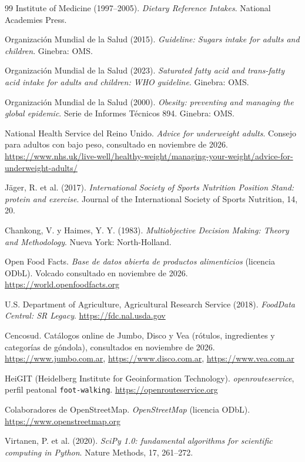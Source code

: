 \documentclass[10pt,a4paper]{article}
\begin{document}
\begin{thebibliography}{99}
 Institute of Medicine (1997--2005). \emph{Dietary Reference Intakes}.
  National Academies Press.

 Organización Mundial de la Salud (2015). \emph{Guideline: Sugars
  intake for adults and children}. Ginebra: OMS.

 Organización Mundial de la Salud (2023). \emph{Saturated fatty
  acid and trans-fatty acid intake for adults and children: WHO guideline}. Ginebra:
  OMS.

 Organización Mundial de la Salud (2000). \emph{Obesity: preventing
  and managing the global epidemic}. Serie de Informes Técnicos 894. Ginebra: OMS.

 National Health Service del Reino Unido. \emph{Advice for underweight
  adults}. Consejo para adultos con bajo peso, consultado en noviembre de 2026.
  \url{https://www.nhs.uk/live-well/healthy-weight/managing-your-weight/advice-for-underweight-adults/}

 Jäger, R. et al. (2017). \emph{International Society of Sports
  Nutrition Position Stand: protein and exercise}. Journal of the International
  Society of Sports Nutrition, 14, 20.

 Chankong, V. y Haimes, Y. Y. (1983). \emph{Multiobjective Decision
  Making: Theory and Methodology}. Nueva York: North-Holland.

 Open Food Facts. \emph{Base de datos abierta de productos
  alimenticios} (licencia ODbL). Volcado consultado en noviembre de 2026.
  \url{https://world.openfoodfacts.org}

 U.S. Department of Agriculture, Agricultural Research Service (2018).
  \emph{FoodData Central: SR Legacy}. \url{https://fdc.nal.usda.gov}

 Cencosud. Catálogos online de Jumbo, Disco y Vea (rótulos,
  ingredientes y categorías de góndola), consultados en noviembre de 2026.
  \url{https://www.jumbo.com.ar}, \url{https://www.disco.com.ar},
  \url{https://www.vea.com.ar}

 HeiGIT (Heidelberg Institute for Geoinformation Technology).
  \emph{openrouteservice}, perfil peatonal \texttt{foot-walking}.
  \url{https://openrouteservice.org}

 Colaboradores de OpenStreetMap. \emph{OpenStreetMap} (licencia ODbL).
  \url{https://www.openstreetmap.org}

 Virtanen, P. et al. (2020). \emph{SciPy 1.0: fundamental algorithms
  for scientific computing in Python}. Nature Methods, 17, 261--272.


\end{thebibliography}
\end{document}
